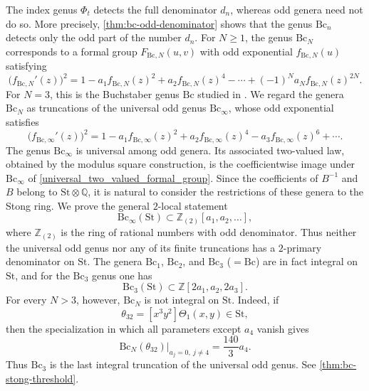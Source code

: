 \documentclass[14pt,dvipsnames]{extarticle}
\numberwithin{equation}{subsection}
\theoremstyle{plain}
\theoremstyle{definition}
\theoremstyle{definition}
\newcommand{\Bc}{\mathrm{Bc}}
\newcommand{\St}{\mathrm{St}}
\newcommand{\Ztwo}{\mathbb{Z}_{(2)}}
\begin{document}
The index genus $\Phi_t$ detects the full denominator $d_n$, whereas odd
genera need not do so. More precisely,
\cref{thm:bc-odd-denominator} shows that the genus $\Bc_n$ detects only the
odd part of the number $d_n$. For $N\geq1$, the genus $\Bc_N$ corresponds to
a formal group $F_{\Bc,N}(u,v)$ with odd exponential $f_{\Bc,N}(u)$ satisfying
\[
 \bigl(f_{\Bc,N}'(z)\bigr)^2
 =1-a_1f_{\Bc,N}(z)^2+a_2f_{\Bc,N}(z)^4-
 \cdots+(-1)^Na_Nf_{\Bc,N}(z)^{2N}.
\]
For $N=3$, this is the Buchstaber genus $\Bc$ studied in \cite{Kor26}. We
regard the genera $\Bc_N$ as truncations of the universal odd genus
$\Bc_\infty$, whose odd exponential satisfies
\[
 \bigl(f_{\Bc,\infty}'(z)\bigr)^2
 =1-a_1f_{\Bc,\infty}(z)^2+a_2f_{\Bc,\infty}(z)^4-
 a_3f_{\Bc,\infty}(z)^6+\cdots.
\]
The genus $\Bc_\infty$ is universal among odd genera. Its associated two-valued
law, obtained by the modulus square construction, is the coefficientwise image under $\Bc_\infty$ of
\eqref{universal_two_valued_formal_group}. Since the coefficients of
$B^{-1}$ and $B$ belong to $\St\otimes\mathbb Q$, it is natural to consider
the restrictions of these genera to the Stong ring. We prove the general
$2$-local statement
\[
 \Bc_\infty(\St)
 \subset\Ztwo[a_1,a_2,\ldots],
\]
where $\Ztwo$ is the ring of rational numbers with odd denominator. Thus
neither the universal odd genus nor any of its finite truncations has a
$2$-primary denominator on $\St$. The genera $\Bc_1$, $\Bc_2$, and
$\Bc_3$ ($=\Bc$) are in fact integral
on $\St$, and for the $\Bc_3$ genus one has
\[
 \Bc_3(\St)\subset\mathbb Z[2a_1,a_2,2a_3].
\]
For every $N>3$, however, $\Bc_N$ is not integral on $\St$. Indeed, if
\[
 \theta_{32}=[x^3y^2]\Theta_1(x,y)\in\St,
\]
then the specialization in which all parameters except $a_4$ vanish gives
\[
 \left.\Bc_N(\theta_{32})\right|_{a_j=0,\ j\ne4}
 =\frac{140}{3}a_4.
\]
Thus $\Bc_3$ is the last integral truncation of the universal odd genus. See
\cref{thm:bc-stong-threshold}.
\end{document}
